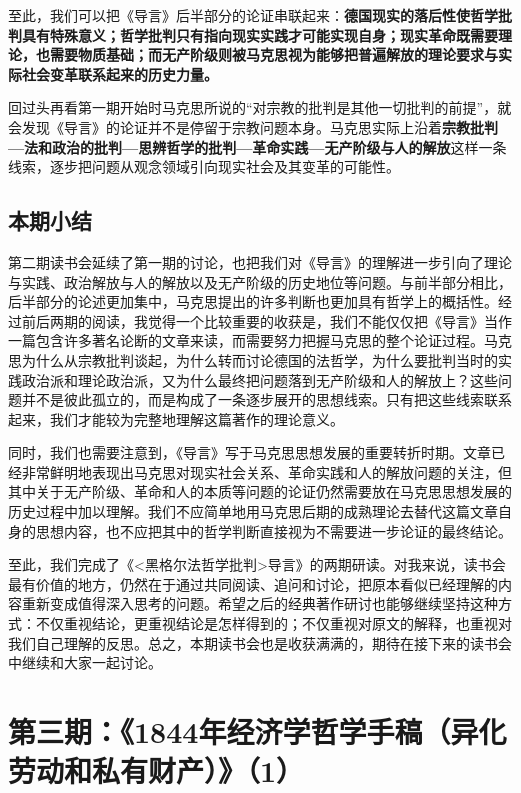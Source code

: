 \documentclass[a4paper,twoside,12pt,AutoFakeBold]{ctexart}
\begin{document}
至此，我们可以把《导言》后半部分的论证串联起来：\textbf{德国现实的落后性使哲学批判具有特殊意义；哲学批判只有指向现实实践才可能实现自身；现实革命既需要理论，也需要物质基础；而无产阶级则被马克思视为能够把普遍解放的理论要求与实际社会变革联系起来的历史力量。}

回过头再看第一期开始时马克思所说的“对宗教的批判是其他一切批判的前提”，就会发现《导言》的论证并不是停留于宗教问题本身。马克思实际上沿着\textbf{宗教批判—法和政治的批判—思辨哲学的批判—革命实践—无产阶级与人的解放}这样一条线索，逐步把问题从观念领域引向现实社会及其变革的可能性。

\subsection{本期小结}

第二期读书会延续了第一期的讨论，也把我们对《导言》的理解进一步引向了理论与实践、政治解放与人的解放以及无产阶级的历史地位等问题。与前半部分相比，后半部分的论述更加集中，马克思提出的许多判断也更加具有哲学上的概括性。经过前后两期的阅读，我觉得一个比较重要的收获是，我们不能仅仅把《导言》当作一篇包含许多著名论断的文章来读，而需要努力把握马克思的整个论证过程。马克思为什么从宗教批判谈起，为什么转而讨论德国的法哲学，为什么要批判当时的实践政治派和理论政治派，又为什么最终把问题落到无产阶级和人的解放上？这些问题并不是彼此孤立的，而是构成了一条逐步展开的思想线索。只有把这些线索联系起来，我们才能较为完整地理解这篇著作的理论意义。

同时，我们也需要注意到，《导言》写于马克思思想发展的重要转折时期。文章已经非常鲜明地表现出马克思对现实社会关系、革命实践和人的解放问题的关注，但其中关于无产阶级、革命和人的本质等问题的论证仍然需要放在马克思思想发展的历史过程中加以理解。我们不应简单地用马克思后期的成熟理论去替代这篇文章自身的思想内容，也不应把其中的哲学判断直接视为不需要进一步论证的最终结论。

至此，我们完成了《<黑格尔法哲学批判>导言》的两期研读。对我来说，读书会最有价值的地方，仍然在于通过共同阅读、追问和讨论，把原本看似已经理解的内容重新变成值得深入思考的问题。希望之后的经典著作研讨也能够继续坚持这种方式：不仅重视结论，更重视结论是怎样得到的；不仅重视对原文的解释，也重视对我们自己理解的反思。总之，本期读书会也是收获满满的，期待在接下来的读书会中继续和大家一起讨论。

\newpage

\section{第三期：《1844年经济学哲学手稿（异化劳动和私有财产）》（1）}
\end{document}
